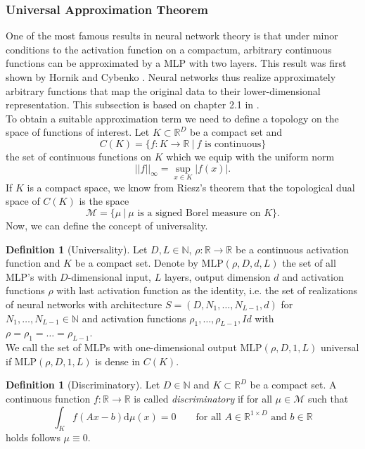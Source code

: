 \documentclass[11pt,titlepage]{article}
\newcommand{\R}{\mathbb{R}} %
\newcommand{\N}{\mathbb{N}} %
\newcommand{\abs}[1]{{\left| #1 \right|}}
\theoremstyle{definition}
\newtheorem{definition}[theorem]{Definition}
\theoremstyle{remark}
\begin{document}
	\subsubsection{Universal Approximation Theorem}
	
	One of the most famous results in neural network theory is that under minor conditions to the activation function on a compactum, arbitrary continuous functions can be approximated by a MLP 
	with two layers. This result was first shown by Hornik \cite{Hornik1989} and Cybenko \cite{Cybenko1989}. Neural networks thus realize approximately arbitrary functions that map the original data to their lower-dimensional representation. This subsection is based on chapter 2.1 in \cite{Petersen2022}. \\
	To obtain a suitable approximation term we need to define a topology on the space of functions of interest. Let $K\subset \R^D$ be a compact set and 
	\[C(K) = \{f:K\to \R \ \vert\  f\text{ is continuous}\}\]
	the set of continuous functions on $K$ which we equip with the uniform norm
	\[\abs{\abs{f}}_\infty = \sup_{x\in K} \abs{f(x)}.\]
	If $K$ is a compact space, we know from Riesz's theorem that the topological dual space of $C(K)$ is the space
	\[\mathscr{M} = \{\mu\ \vert\  \mu\text{ is a signed Borel measure on }K\}.\]
	Now, we can define the concept of universality.
	\begin{definition}[Universality]
		Let $D,L\in\N$, $\rho :\R\to\R$ be a continuous activation function and $K$ be a 
		compact set. Denote by $\mathrm{MLP}(\rho, D, d, L)$ the set of all MLP's with 
		$D$-dimensional input, $L$ layers, output dimension $d$ and activation functions $\rho$ with
		last activation function as the identity, i.e. 
		the set of realizations of neural networks with architecture 
		$S = (D, N_1, \ldots, N_{L-1}, d)$ for $N_1,\ldots, N_{L-1}\in\N$ and 
		activation functions $\rho_1,\ldots,\rho_{L-1}, Id$ with $\rho =\rho_1=\ldots=\rho_{L-1}$. \\
		We call the set of MLPs with one-dimensional output $\mathrm{MLP}(\rho, D, 1, L)$ universal if $\mathrm{MLP}(\rho, D, 1, L)$ is 
		dense in $C(K)$.
	\end{definition}
	
	\begin{definition}[Discriminatory]
		Let $D\in\N$ and $K\subset\R^D$ be a compact set. A continuous function 
		$f:\R\to\R$ is called \textsl{discriminatory} if for all $\mu\in\mathscr{M}$ 
		such that
		\[\int_K f(Ax -b)\mathrm{d}\mu(x) = 0 \qquad \text{for all $A\in\R^{1\times D}$ and $b\in\R$}\]
		holds follows $\mu \equiv 0$.
	\end{definition}
	
\end{document}
